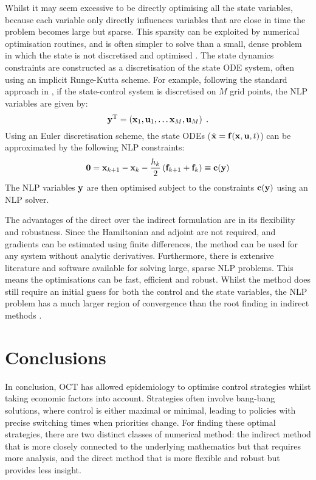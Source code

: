Whilst it may seem excessive to be directly optimising all the state variables, because each variable only directly influences variables that are close in time the problem becomes large but sparse. This sparsity can be exploited by numerical optimisation routines, and is often simpler to solve than a small, dense problem in which the state is not discretised and optimised \citep{betts_practical_2010}. The state dynamics constraints are constructed as a discretisation of the state ODE system, often using an implicit Runge-Kutta scheme. For example, following the standard approach in \citet{betts_practical_2010}, if the state-control system is discretised on $M$ grid points, the NLP variables are given by:
\begin{equation}
    \mathbf{\bm{y}}^\mathrm{T} = \left(\mathbf{\bm{x}}_1, \mathbf{\bm{u}}_1, \ldots \mathbf{\bm{x}}_M, \mathbf{\bm{u}}_M\right)\;.
\end{equation}
Using an Euler discretisation scheme, the state ODEs ($\dot{\mathbf{\bm{x}}} = \mathbf{\bm{f}}(\mathbf{\bm{x}}, \mathbf{\bm{u}}, t)$) can be approximated by the following NLP constraints:
\begin{equation}
    \mathbf{\bm{0}} = \mathbf{\bm{x}}_{k+1} - \mathbf{\bm{x}}_k - \frac{h_k}{2}\left(\mathbf{\bm{f}}_{k+1} + \mathbf{\bm{f}}_k\right) \equiv \mathbf{\bm{c}}(\mathbf{\bm{y}})
\end{equation}
The NLP variables $\mathbf{\bm{y}}$ are then optimised subject to the constraints $\mathbf{\bm{c}}(\mathbf{\bm{y}})$ using an NLP solver.

The advantages of the direct over the indirect formulation are in its flexibility and robustness. Since the Hamiltonian and adjoint are not required, and gradients can be estimated using finite differences, the method can be used for any system without analytic derivatives. Furthermore, there is extensive literature and software available for solving large, sparse NLP problems. This means the optimisations can be fast, efficient and robust. Whilst the method does still require an initial guess for both the control and the state variables, the NLP problem has a much larger region of convergence than the root finding in indirect methods \citep{betts_practical_2010}.

\section{Conclusions}

In conclusion, OCT has allowed epidemiology to optimise control strategies whilst taking economic factors into account. Strategies often involve bang-bang solutions, where control is either maximal or minimal, leading to policies with precise switching times when priorities change. For finding these optimal strategies, there are two distinct classes of numerical method: the indirect method that is more closely connected to the underlying mathematics but that requires more analysis, and the direct method that is more flexible and robust but provides less insight.
